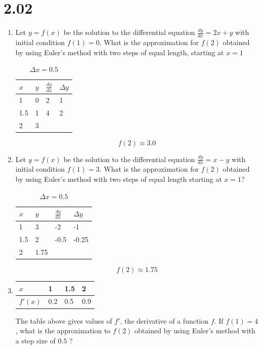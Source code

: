 \documentclass[12pt]{article}
\begin{document}
\section*{2.02}
\begin{enumerate}
    \item Let $y=f(x)$ be the solution to the differential equation $\frac{dy}{dx}=2x+y$ with initial condition $f(1)=0$. What is the approximation for $f(2)$ obtained by using Euler’s method with two steps of equal length, starting at $x=1$

\begin{table}[H]
\caption{$\Delta x = 0.5$}
\centering \label{table_example}
\begin{tabular}{l|lll}
$x$ & \multicolumn{1}{l|}{$y$} & \multicolumn{1}{l|}{$\frac{dy}{dx}$} & $\Delta y$ \\ \hline
1 & 0 & 2 & 1 \\
1.5 & 1 & 4 & 2 \\
2 & 3 &  & 
\end{tabular}
\end{table}
$$\boxed{f(2) \approx 3.0}$$

\item Let $y=f(x)$ be the solution to the differential equation $\frac{dy}{dx}=x-y$ with initial condition $f(1)=3$. What is the approximation for $f(2)$ obtained by using Euler’s method with two steps of equal length starting at $x=1$?

\begin{table}[H]
\caption{$\Delta x = 0.5$}
\centering \label{table_example}
\begin{tabular}{l|lll}
$x$ & \multicolumn{1}{l|}{$y$} & \multicolumn{1}{l|}{$\frac{dy}{dx}$} & $\Delta y$ \\ \hline
1 & 3 & -2 & -1 \\
1.5 & 2 & -0.5 & -0.25 \\
2 & 1.75 &  & 
\end{tabular}
\end{table}
$$\boxed{f(2) \approx 1.75}$$
    
    \item 
\begin{table}[H]
\centering
\begin{tabular}{l|lll}
$x$     & 1   & 1.5 & 2   \\ \hline
$f'(x)$ & 0.2 & 0.5 & 0.9
\end{tabular}
\end{table}
The table above gives values of $f'$, the derivative of a function $f$. If $f(1)=4$, what is the approximation to $f(2)$ obtained by using Euler’s method with a step size of $0.5$ ?


\end{enumerate}
\end{document}
